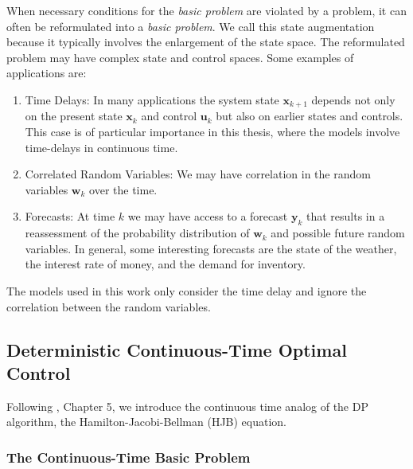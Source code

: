 When necessary conditions for the \textit{basic problem} are violated by a problem, it can 
often be reformulated into a \textit{basic problem}. We call this state augmentation 
because it typically involves the enlargement of the state space. The  reformulated problem 
may have complex state and control spaces.
Some examples of applications are:
\begin{enumerate}

\item Time Delays: In many applications the system state $\bm{x}_{k+1}$ depends not 
only on the present state $\bm{x}_k$ and control $\bm{u}_k$ but also on earlier 
states and controls. This case is of particular importance in this thesis, where the models
involve time-delays in continuous time.

\item Correlated Random Variables: We may have correlation in the random variables $\bm{w}_k$ over the time.

\item Forecasts: At time $k$ we may have access to a forecast $\bm{y}_k$ 
that results in a reassessment of the probability distribution of $\bm{w}_k$ 
and possible future random variables. In general, some interesting forecasts
are the state of the weather, the interest rate of money, and the demand for inventory.

\end{enumerate}

The models used in this work only consider the time delay and ignore the 
correlation between the random variables.

\subsection{Deterministic Continuous-Time Optimal Control}

Following \cite{berkovitz2013optimal}, Chapter 5, we introduce the continuous time analog 
of the DP algorithm, the Hamilton-Jacobi-Bellman (HJB) equation.

\subsubsection{The Continuous-Time Basic Problem} \label{Subsection_CTOP}

